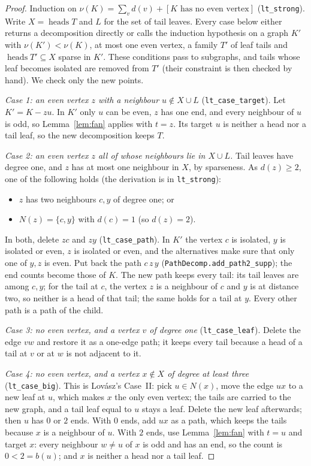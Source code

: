 \documentclass[11pt]{amsart}
\theoremstyle{definition}
\newcommand{\heads}{\operatorname{heads}}
\begin{document}
\begin{proof}
Induction on $\nu(K)=\sum_v d(v)+[K\text{ has no even vertex}]$ (\texttt{lt\_strong}). Write
$X=\heads T$ and $L$ for the set of tail leaves. Every case below either returns a decomposition
directly or calls the induction hypothesis on a graph $K'$ with $\nu(K')<\nu(K)$, at most one even
vertex, a family $T'$ of leaf tails and $\heads T'\subseteq X$ sparse in $K'$. These conditions pass
to subgraphs, and tails whose leaf becomes isolated are removed from $T'$ (their constraint is
then checked by hand). We check only the new points.

\emph{Case 1: an even vertex $z$ with a neighbour $u\notin X\cup L$} (\texttt{lt\_case\_target}).
Let $K'=K-zu$. In $K'$ only $u$ can be even, $z$ has one end, and every neighbour of $u$ is odd, so
Lemma~\ref{lem:fan} applies with $t=z$. Its target $u$ is neither a head nor a tail leaf, so the
new decomposition keeps $T$.

\emph{Case 2: an even vertex $z$ all of whose neighbours lie in $X\cup L$.} Tail leaves have degree
one, and $z$ has at most one neighbour in $X$, by sparseness. As $d(z)\ge2$, one of the following
holds (the derivation is in \texttt{lt\_strong}):
\begin{itemize}
\item $z$ has two neighbours $c,y$ of degree one; or
\item $N(z)=\{c,y\}$ with $d(c)=1$ (so $d(z)=2$).
\end{itemize}
In both, delete $zc$ and $zy$ (\texttt{lt\_case\_path}). In $K'$ the vertex $c$ is isolated, $y$ is
isolated or even, $z$ is isolated or even, and the alternatives make sure that only one of $y,z$ is
even. Put back the path $c\,z\,y$ (\texttt{PathDecomp.add\_path2\_supp}); the end counts become
those of $K$. The new path keeps every tail: its tail leaves are among $c,y$; for the tail at $c$,
the vertex $z$ is a neighbour of $c$ and $y$ is at distance two, so neither is a head of that tail;
the same holds for a tail at $y$. Every other path is a path of the child.

\emph{Case 3: no even vertex, and a vertex $v$ of degree one} (\texttt{lt\_case\_leaf}). Delete the
edge $vw$ and restore it as a one-edge path; it keeps every tail because a head of a tail at $v$ or
at $w$ is not adjacent to it.

\emph{Case 4: no even vertex, and a vertex $x\notin X$ of degree at least three}
(\texttt{lt\_case\_big}). This is Lov\'asz's Case~II: pick $u\in N(x)$, move the edge $ux$ to a new
leaf at $u$, which makes $x$ the only even vertex; the tails are carried to the new graph, and a tail
leaf equal to $u$ stays a leaf. Delete the new leaf afterwards; then $u$ has $0$ or $2$ ends. With
$0$ ends, add $ux$ as a path, which keeps the tails because $x$ is a neighbour of $u$. With $2$ ends,
use Lemma~\ref{lem:fan} with $t=u$ and target $x$: every neighbour $w\ne u$ of $x$ is odd and has an
end, so the count is $0<2=b(u)$; and $x$ is neither a head nor a tail leaf.


\end{proof}
\end{document}
